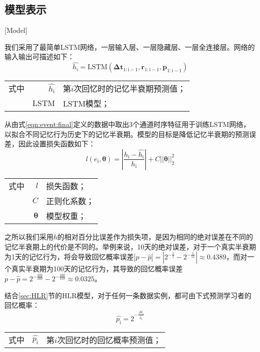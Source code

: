 \subsection{模型表示}[Model]\label{sec:LSTM}

我们采用了最简单LSTM网络，一层输入层、一层隐藏层、一层全连接层。网络的输入输出可描述如下：
\begin{equation}
\hat{h_\mathrm{i}}=\mathrm{LSTM}(\bm{\Delta t}_\mathrm{1:i-1}, \bm r_\mathrm{1:i-1}, \bm p_\mathrm{1:i-1})
\end{equation}
\begin{tabularx}{\textwidth}{@{}l@{\quad}r@{———}X@{}}
    式中&  $\hat{h_\mathrm{i}}$ &第$i$次回忆时的记忆半衰期预测值；\\
    &  $\mathrm{LSTM}$ &LSTM模型；
\end{tabularx}\vspace{3.15bp}

从由式\ref{eqn:event:final}定义的数据中取出3个通道时序特征用于训练LSTM网络，以拟合不同记忆行为历史下的记忆半衰期。模型的目标是降低记忆半衰期的预测误差，因此设置损失函数如下：
\begin{equation}
l(e_\mathrm{i},\bm\theta)=|\frac{h_\mathrm{i}-\hat{h_\mathrm{i}}}{h_\mathrm{i}}|+C||\bm\theta||_{2}^{2}
\end{equation}
\begin{tabularx}{\textwidth}{@{}l@{\quad}r@{———}X@{}}
    式中& $l$ &损失函数；\\
    &  $C$ &正则化系数；\\
    &  $\bm\theta$ &模型权重；
\end{tabularx}\vspace{3.15bp}

之所以我们采用$h$的相对百分比误差作为损失项，是因为相同的绝对误差在不同的记忆半衰期上的代价是不同的。举例来说，10天的绝对误差，对于一个真实半衰期为1天的记忆行为，将会导致回忆概率误差$|p-\hat{p}|=|2^{-\frac{1}{1}}-2^{-\frac{1}{11}}|\approx 0.4389$，而对一个真实半衰期为100天的记忆行为，其导致的回忆概率误差$p-\hat{p}=2^{-\frac{100}{100}}-2^{-\frac{100}{110}}\approx 0.0325$。

结合\ref{sec:HLR}节的HLR模型，对于任何一条数据实例，都可由下式预测学习者的回忆概率：
\begin{equation}
    \hat{p_\mathrm{i}}=2^{-\frac{\Delta t_\mathrm{i}}{\hat{h_\mathrm{i}}}}
\end{equation}
\begin{tabularx}{\textwidth}{@{}l@{\quad}r@{———}X@{}}
    式中& $\hat{p_\mathrm{i}}$ &第$i$次回忆时的回忆概率预测值；
\end{tabularx}\vspace{3.15bp}


